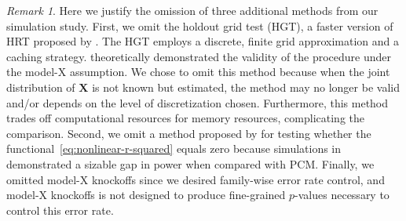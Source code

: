 \documentclass[12pt]{article}
\theoremstyle{definition}
\theoremstyle{remark}
\newtheorem{remark}{Remark}
\newcommand{\prx}{\bm X}								%
\newcommand{\law}{\mathcal L}							%
\newcommand{\minus}{\textnormal{-}} 						    %
\begin{document}
	\begin{remark}
	Here we justify the omission of three additional methods from our simulation study. First, we omit the holdout grid test (HGT), a faster version of HRT proposed by \citet{Tansey2018}. The HGT employs a discrete, finite grid approximation and a caching strategy. \citet{Tansey2018} theoretically demonstrated the validity of the procedure under the model-X assumption. We chose to omit this method because when the joint distribution of $\prx$ is not known but estimated, the method may no longer be valid and/or depends on the level of discretization chosen. Furthermore, this method trades off computational resources for memory resources, complicating the comparison. Second, we omit a method proposed by \citet{Williamson2021a} for testing whether the functional~\eqref{eq:nonlinear-r-squared} equals zero because simulations in \citet{Lundborg2022a} demonstrated a sizable gap in power when compared with PCM. Finally, we omitted model-X knockoffs since we desired family-wise error rate control, and model-X knockoffs is not designed to produce fine-grained $p$-values necessary to control this error rate.
	\end{remark}



	
\end{document}
